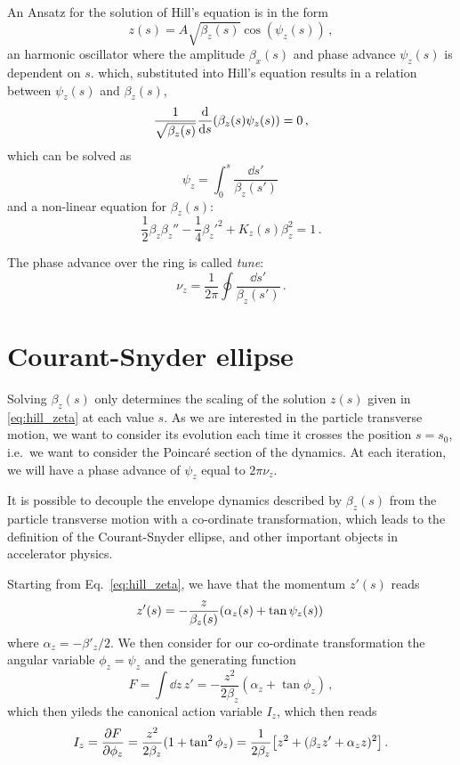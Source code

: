An Ansatz for the solution of Hill's equation is in the form
\begin{equation}
	z(s)=A\sqrt{\beta_z(s)}\cos\left(\psi_z(s)\right)\,,
	\label{eq:hill_zeta}
\end{equation}
%
\ie an harmonic oscillator where the amplitude $\beta_x(s)$ and phase advance $\psi_z(s)$ is dependent on $s$. which, substituted into Hill's equation results in a relation between $\psi_z(s)$ and $\beta_z(s)$,
%
\begin{equation}
	\frac{1}{\sqrt{\beta_z(s)}} \dv{s}(\beta_z(s)\psi_z(s)) = 0\,,
\end{equation}
%
which can be solved as
%
\begin{equation}
	\psi_z = \int_0^s \frac{\dd s'}{\beta_z(s')}\,
\end{equation}
%
and a non-linear equation for $\beta_z(s)$:
%
\begin{equation}
	\frac{1}{2}\beta_z\beta_z''-\frac{1}{4}\beta_z'^2+K_z(s)\beta_z^2=1\,.
\end{equation}

The phase advance over the ring is called \textit{tune}:
\begin{equation}
	\nu_z = \frac{1}{2\pi}\oint \frac{\dd s'}{\beta_z(s')}\,.
    \label{eq:tune_def}
\end{equation} 


\section{Courant-Snyder ellipse}

Solving $\beta_z(s)$ only determines the scaling of the solution $z(s)$ given in \eqref{eq:hill_zeta} at each value $s$. As we are interested in the particle transverse motion, we want to consider its evolution each time it crosses the position $s=s_0$, i.e.\ we want to consider the Poincaré section of the dynamics. At each iteration, we will have a phase advance of $\psi_z$ equal to $2\pi\nu_z$.

It is possible to decouple the envelope dynamics described by $\beta_z(s)$ from the particle transverse motion with a co-ordinate transformation, which leads to the definition of the Courant-Snyder ellipse, and other important objects in accelerator physics.

Starting from Eq.~\eqref{eq:hill_zeta}, we have that the momentum $z'(s)$ reads
%
\begin{equation}
	z'(s)=-\frac{z}{\beta_z(s)}\qty(\alpha_z(s)+\tan\psi_z(s))\,
\end{equation}
%
where $\alpha_z=-\beta'_z/2$. We then consider for our co-ordinate transformation the angular variable $\phi_z=\psi_z$ and the generating function
%
\begin{equation}
	F=\int \dd z\, z' = -\frac{z^2}{2\beta_z}(\alpha_z+\tan\phi_z) \,,
\end{equation}
%
which then yileds the canonical action variable $I_z$, which then reads
%
\begin{equation}
	I_z=\pdv{F}{\phi_z}=\frac{z^2}{2\beta_z}(1+\tan^2\phi_z)=\frac{1}{2\beta_z}\qty[z^2+(\beta_z z'+\alpha_z z)^2]\,.
	\label{eq:jz}
\end{equation}

